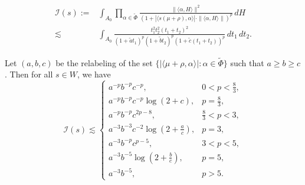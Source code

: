 \documentclass[10pt,a4paper]{amsart}
\begin{document}
\begin{align}
\mathcal{I}(s):=&\int_{A_0} \prod_{\alpha\in\widetilde{\Phi}}
   \frac{\|\langle\alpha,H\rangle\|^2}{(1+|\langle s(\mu+\rho),\alpha\rangle|\cdot\|\langle\alpha, H\rangle\|)^{p}}
   \,dH \label{eq: ABC integral} \\
   \lesssim& \int_{A_0}\frac{t_1^2t_2^2(t_1+t_2)^2}{(1+\widetilde{a}t_1)^p(1+\widetilde{b}t_2)^p(1+\widetilde{c}(t_1+t_2))^p}\,dt_1\,dt_2. \label{eq: ABC integral 2}
\end{align}

\begin{prop}\label{prop: I}
Let $(a,b,c)$ be the relabeling of the set 
$\{ |\langle \mu+\rho, \alpha \rangle| : \alpha \in \widetilde{\Phi} \}$ such that $a\ge b\ge c$. Then for all $s\in W$, we have 
    \[
\mathcal I(s)\lesssim
\begin{cases}
a^{-p}b^{-p}c^{-p}, & 0<p<\frac83,\\[1mm]
a^{-p}b^{-p}c^{-p}\log(2+c), & p=\frac83,\\[1mm]
a^{-p}b^{-p}c^{2p-8}, & \frac83<p<3,\\[1mm]
a^{-3}b^{-3}c^{-2}\log\left(2+\frac ac\right), & p=3, \\[1mm]
a^{-3}b^{-p}c^{p-5}, & 3<p<5,\\[1mm]
a^{-3}b^{-5}\log\left(2+\frac bc\right), & p=5,\\[1mm]
a^{-3}b^{-5}, & p>5.
\end{cases}
\]
\end{prop}
\end{document}
